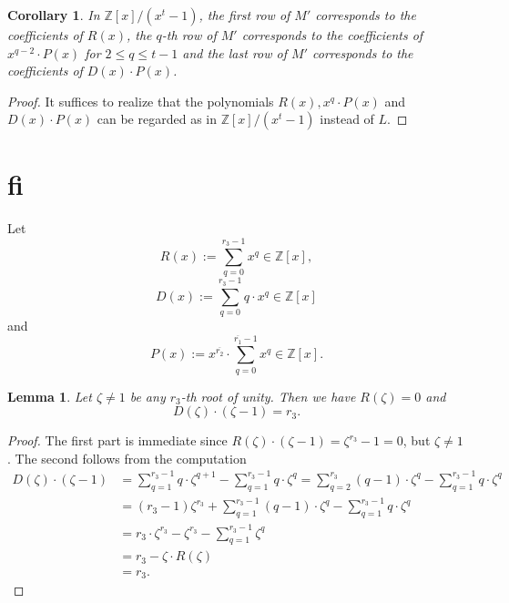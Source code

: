 \documentclass[12pt,a4paper]{article}
\newtheorem{lemma}[theorem]{Lemma}
\newtheorem{cor}[theorem]{Corollary}
\theoremstyle{definition}
\newcommand{\Z}{\mathbb{Z}}
\newcommand{\uo}{\overline{r_2}}
\newcommand{\vo}{\overline{r_1}}
\begin{document}
\begin{cor}
In $\Z[x]/(x^t-1)$, the first row of $M'$ corresponds to the coefficients of $R(x)$, the $q$-th row of $M'$ corresponds to the coefficients of $x^{q-2}\cdot P(x)$ for $2\leq q\leq t-1$ and the last row of $M'$ corresponds to the coefficients of $D(x)\cdot P(x)$.
\end{cor}
\begin{proof}
It suffices to realize that the polynomials $R(x), x^q\cdot P(x)$ and $D(x)\cdot P(x)$ can be regarded as in $\Z[x]/(x^t-1)$ instead of $L$.
\end{proof}
\section{fi}
\fi

\paragraph*{}
Let $$R(x):=\sum_{q=0}^{r_3-1} x^q\in\Z[x],$$
$$D(x):=\sum_{q=0}^{r_3-1}q\cdot x^q\in \Z[x]$$
and 
$$P(x):=x^{\uo}\cdot \sum_{q=0}^{\vo-1} x^q\in \Z[x].$$

\begin{lemma}
Let $\zeta\neq 1$ be any $r_3$-th root of unity. Then we have $R(\zeta)=0$ and $$D(\zeta)\cdot(\zeta-1)=r_3.$$
\end{lemma}
\begin{proof}
The first part is immediate since $R(\zeta)\cdot(\zeta-1)=\zeta^{r_3}-1=0$, but $\zeta\neq 1$. The second follows from the computation
\begin{equation*}
\begin{split}
D(\zeta)\cdot(\zeta-1)&=\sum_{q=1}^{r_3-1} q\cdot \zeta^{q+1}-\sum_{q=1}^{r_3-1} q\cdot \zeta^q=\sum_{q=2}^{r_3} (q-1)\cdot \zeta^{q}-\sum_{q=1}^{r_3-1} q\cdot \zeta^q\\
&=(r_3-1)\zeta^{r_3}+\sum_{q=1}^{r_3-1} (q-1)\cdot \zeta^{q}-\sum_{q=1}^{r_3-1} q\cdot \zeta^q\\
&=r_3\cdot \zeta^{r_3}-\zeta^{r_3}-\sum_{q=1}^{r_3-1} \zeta^{q}\\
&=r_3-\zeta\cdot R(\zeta)\\
&=r_3.
\end{split}
\end{equation*}
\end{proof}
\end{document}
